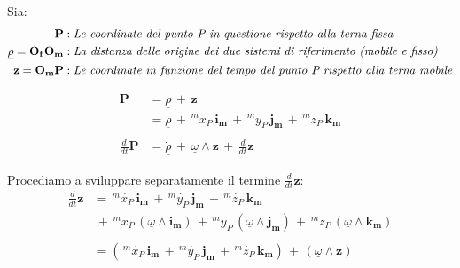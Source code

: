 			Sia:\begin{align*}
			 \mathbf{P} &: \emph{Le coordinate del punto P in questione rispetto alla terna fissa}\\
			 \underline{\rho} = \mathbf{O_fO_m} &: \emph{La distanza delle origine dei due sistemi di riferimento (mobile e fisso)}\\
			 \mathbf{z} = \mathbf{O_mP} &: \emph{Le coordinate in funzione del tempo del punto P rispetto alla terna mobile}
			\end{align*}

			\begin{equation*}
				\begin{split}
					\mathbf{P} &= \underline{\rho}\,+\,\mathbf{z}\\
					&= \underline{\rho}\, + \, ^mx_P\,\mathbf{i_m}\,+\, ^my_P\,\mathbf{j_m}\,+\, ^mz_P\,\mathbf{k_m}\\
					\\
					\frac{d}{dt}\mathbf{P} &= \dot{\underline{\rho}} \, +\, \underline{\omega}\wedge\mathbf{z}\, +\,\frac{d}{dt}\mathbf{z}
				\end{split}
			\end{equation*}
			
			Procediamo a sviluppare separatamente il termine  $\frac{d}{dt}\mathbf{z}$:
			\[
				\begin{split}
					\frac{d}{dt}\mathbf{z} &=   \, ^m\dot{x_P}\,\mathbf{i_m}\,+\, ^m\dot{y_P}\,\mathbf{j_m}\,+\, ^m\dot{z_P}\,\mathbf{k_m}\\
													&\, +\, ^mx_P\,(\underline{\omega}\wedge\mathbf{i_m})\,+\, ^my_P\,(\underline{\omega}\wedge\mathbf{j_m})\,+\, ^mz_P\,(\underline{\omega}\wedge\mathbf{k_m})\\
													\\
													&= ( \, ^m\dot{x_P}\,\mathbf{i_m}\,+\, ^m\dot{y_P}\,\mathbf{j_m}\,+\, ^m\dot{z_P}\,\mathbf{k_m})\,+\,(\underline{\omega}\wedge\mathbf{z})
				\end{split}
			\]
			
